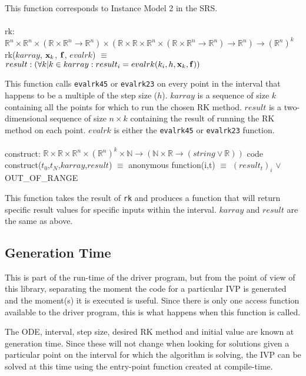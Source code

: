 \documentclass[12pt, titlepage]{article}
\begin{document}
This function corresponds to Instance Model 2 in the SRS.\\
\\
rk: $\mathbb{R}^n \times \mathbb{R}^n \times 
(\mathbb{R} \times \mathbb{R}^n \rightarrow \mathbb{R}^n) \times
(\mathbb{R} \times \mathbb{R} \times \mathbb{R}^n \times (\mathbb{R} 
\times \mathbb{R}^n \rightarrow \mathbb{R}^n) \rightarrow \mathbb{R}^n) 
\rightarrow (\mathbb{R}^n)^k$\\
rk($karray$, ${\bf x}_k$, ${\bf f}$, $evalrk$) $\equiv$ $result : (\forall k | 
k 
\in karray : result_i = evalrk (k_i,h, {\bf x}_k, {\bf f}))$

This function calls \lstinline[language=ML]|evalrk45| or 
\lstinline[language=ML]|evalrk23| on every point in the interval that happens 
to be a multiple of the step size ($h$). $karray$ is a sequence of size $k$ 
containing all the points for 
which to run the chosen RK method. $result$ is a two-dimensional 
sequence of size $n \times k$ containing the result of running the RK method on 
each point. $evalrk$ is either the \lstinline[language=ML]|evalrk45| or 
\lstinline[language=ML]|evalrk23| function.\\
\\
construct: $\mathbb{R} \times \mathbb{R} \times \mathbb{R}^n \times 
(\mathbb{R}^n)^k \times \mathbb{N} \rightarrow (\mathbb{N} \times \mathbb{R} 
\rightarrow (string \lor \mathbb{R}))$ code\\
construct($t_0$,$t_N$,$karray$,$result$) $\equiv$ anonymous function(i,t) 
$\equiv$ $(result_t)_i$ $\lor$ OUT\_OF\_RANGE

This function takes the result of \lstinline[language=ML]|rk| and produces a 
function that will return specific result values for specific inputs  within the 
interval. $karray$ and $result$ are the same as above.

\subsection{Generation Time}\label{ssec:generation-time}
This is part of the run-time of the driver program, but from the point of view 
of this library, separating the moment the code for a particular IVP is 
generated and the moment(s) it is executed is useful. Since there is only one 
access function available to the driver program, this is what happens when this 
function is called.

The ODE, interval, step size, desired RK method and initial value are known at 
generation time. 
Since these will not change when looking for solutions given a particular point 
on the interval for which the algorithm is solving, the IVP can be solved at 
this time using the entry-point function created at compile-time.
\end{document}

